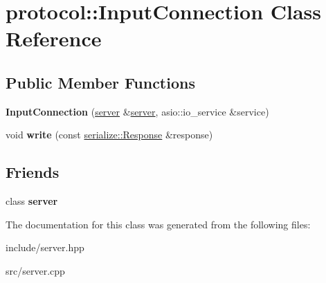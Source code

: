\hypertarget{classprotocol_1_1_input_connection}{}\section{protocol\+:\+:Input\+Connection Class Reference}
\label{classprotocol_1_1_input_connection}
\subsection*{Public Member Functions}
\begin{DoxyCompactItemize}
\item 
\mbox{\label{classprotocol_1_1_input_connection_ae1d8754ff67704bdf7d0d9410c0c7d14}} 
{\bfseries Input\+Connection} (\hyperlink{classprotocol_1_1server}{server} \&\hyperlink{classprotocol_1_1server}{server}, asio\+::io\+\_\+service \&service)
\item 
\mbox{\label{classprotocol_1_1_input_connection_ade67598e7ecf40ca76f718321c0db2df}} 
void {\bfseries write} (const \hyperlink{structprotocol_1_1serialize_1_1_response}{serialize\+::\+Response} \&response)
\end{DoxyCompactItemize}
\subsection*{Friends}
\begin{DoxyCompactItemize}
\item 
\mbox{\label{classprotocol_1_1_input_connection_a8bf6e2cf871b0a2131f73727ffbf94cb}} 
class {\bfseries server}
\end{DoxyCompactItemize}


The documentation for this class was generated from the following files\+:\begin{DoxyCompactItemize}
\item 
include/server.\+hpp\item 
src/server.\+cpp\end{DoxyCompactItemize}
